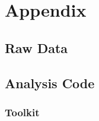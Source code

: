 \documentclass[aip, cp, amsmath, amssymb, reprint]{revtex4-2}
\begin{document}


\appendix
\section{Appendix}
\subsection{Raw Data}

\subsection{Analysis Code}
\subsubsection{Toolkit}

\end{document}
